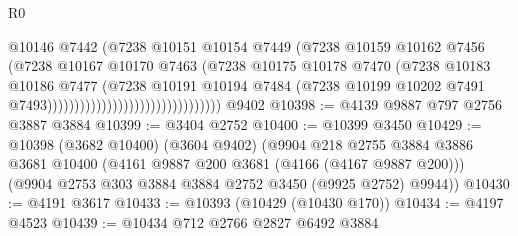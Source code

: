 \begin{lexlean}{R0}
\begin{coremodule}
                                                      @10146
                                                      @7442
                                                      (@7238
                                                        @10151
                                                        @10154
                                                        @7449
                                                        (@7238
                                                          @10159
                                                          @10162
                                                          @7456
                                                          (@7238
                                                            @10167
                                                            @10170
                                                            @7463
                                                            (@7238
                                                              @10175
                                                              @10178
                                                              @7470
                                                              (@7238
                                                                @10183
                                                                @10186
                                                                @7477
                                                                (@7238
                                                                  @10191
                                                                  @10194
                                                                  @7484
                                                                  (@7238
                                                                    @10199
                                                                    @10202
                                                                    @7491
                                                                    @7493))))))))))))))))))))))))))))))))
    @9402
@10398 := @4139 @9887 @797 @2756 @3887 @3884
@10399 := @3404 @2752
@10400 := @10399 @3450
@10429 := @10398
    (@3682 @10400)
    (@3604 @9402)
    (@9904
      @218
      @2755
      @3884
      @3886
      @3681
      @10400
      (@4161 @9887 @200 @3681 (@4166 (@4167 @9887 @200)))
      (@9904 @2753 @303 @3884 @3884 @2752 @3450 (@9925 @2752) @9944))
@10430 := @4191 @3617
@10433 := @10393 (@10429 (@10430 @170))
@10434 := @4197 @4523
@10439 := @10434 @712 @2766 @2827 @6492 @3884

\end{coremodule}
\end{lexlean}

